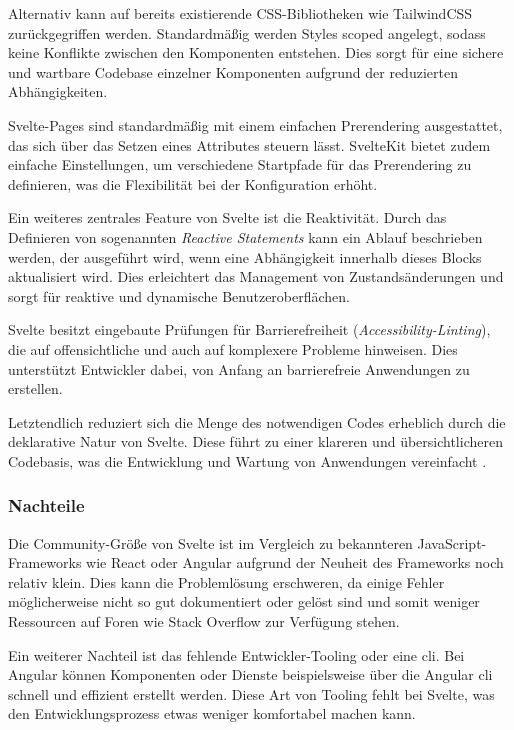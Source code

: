 Alternativ kann auf bereits existierende CSS-Bibliotheken wie TailwindCSS zurückgegriffen werden. Standardmäßig werden Styles scoped angelegt, sodass keine Konflikte zwischen den Komponenten entstehen. Dies sorgt für eine sichere und wartbare Codebase einzelner Komponenten aufgrund der reduzierten Abhängigkeiten.

Svelte-Pages sind standardmäßig mit einem einfachen Prerendering ausgestattet, das sich über das Setzen eines Attributes steuern lässt. SvelteKit bietet zudem einfache Einstellungen, um verschiedene Startpfade für das Prerendering zu definieren, was die Flexibilität bei der Konfiguration erhöht.

Ein weiteres zentrales Feature von Svelte ist die Reaktivität. Durch das Definieren von sogenannten \textit{Reactive Statements} kann ein Ablauf beschrieben werden, der ausgeführt wird, wenn eine Abhängigkeit innerhalb dieses Blocks aktualisiert wird. Dies erleichtert das Management von Zustandsänderungen und sorgt für reaktive und dynamische Benutzeroberflächen.

Svelte besitzt eingebaute Prüfungen für Barrierefreiheit (\textit{Accessibility-Linting}), die auf offensichtliche und auch auf komplexere Probleme hinweisen. Dies unterstützt Entwickler dabei, von Anfang an barrierefreie Anwendungen zu erstellen.

Letztendlich reduziert sich die Menge des notwendigen Codes erheblich durch die deklarative Natur von Svelte. Diese führt zu einer klareren und übersichtlicheren Codebasis, was die Entwicklung und Wartung von Anwendungen vereinfacht \autocite{SvelteExperienceBespoyasov}.

\subsubsection{Nachteile}

Die Community-Größe von Svelte ist im Vergleich zu bekannteren JavaScript-Frameworks wie React oder Angular aufgrund der Neuheit des Frameworks noch relativ klein. Dies kann die Problemlösung erschweren, da einige Fehler möglicherweise nicht so gut dokumentiert oder gelöst sind und somit weniger Ressourcen auf Foren wie Stack Overflow zur Verfügung stehen.

Ein weiterer Nachteil ist das fehlende Entwickler-Tooling oder eine \ac{cli}. Bei Angular können Komponenten oder Dienste beispielsweise über die Angular \ac{cli} schnell und effizient erstellt werden. Diese Art von Tooling fehlt bei Svelte, was den Entwicklungsprozess etwas weniger komfortabel machen kann.

